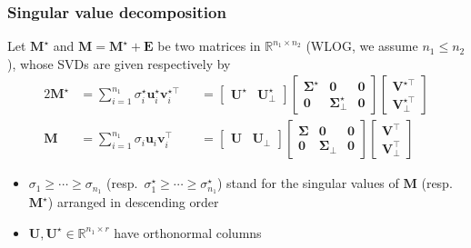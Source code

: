 \documentclass[compress,
mathserif,wide,%
]{beamer}
\begin{document}
\begin{frame}
\frametitle{Singular value decomposition}

Let $\bm{M}^{\star}$ and $\bm{M}=\bm{M}^{\star}+\bm{E}$ be two matrices
in $\mathbb{R}^{n_1 \times n_2}$ (WLOG, we assume $n_1\leq n_2$), whose SVDs
are given respectively by
%
\begin{alignat*}{2}
\bm{M}^{\star} & =\sum_{i=1}^{n_1}\sigma_{i}^{\star}\bm{u}_{i}^{\star}\bm{v}_{i}^{\star\top} & & =\left[\begin{array}{cc}
\bm{U}^{\star} & \bm{U}_{\perp}^{\star}\end{array}\right]\left[\begin{array}{ccc}
\bm{\Sigma}^{\star} & \bm{0} & \bm{0}\\
\bm{0} & \bm{\Sigma}_{\perp}^{\star} & \bm{0}
\end{array}\right]\left[\begin{array}{c}
\bm{V}^{\star\top}\\
\bm{V}_{\perp}^{\star\top}
\end{array}\right] \\
\bm{M} & =\sum_{i=1}^{n_1}\sigma_{i}\bm{u}_{i}\bm{v}_{i}^{\top} & & =\left[\begin{array}{cc}
\bm{U} & \bm{U}_{\perp}\end{array}\right]\left[\begin{array}{ccc}
\bm{\Sigma} & \bm{0} & \bm{0}\\
\bm{0} & \bm{\Sigma}_{\perp} & \bm{0}
\end{array}\right]\left[\begin{array}{c}
\bm{V}^{\top}\\
\bm{V}_{\perp}^{\top}
\end{array}\right]
\end{alignat*}


\begin{itemize}
	\item $\sigma_{1}\geq\cdots\geq\sigma_{n_1}$ (resp.~$\sigma_{1}^{\star}\geq\cdots\geq\sigma_{n_1}^{\star}$)
stand for the singular values of $\bm{M}$ (resp.~$\bm{M}^{\star}$)
arranged in descending order
	\item $\bm{U}, \bm{U}^{\star} \in \mathbb{R}^{n_1 \times r}$ have orthonormal columns
\end{itemize}
\end{frame}
\end{document}
